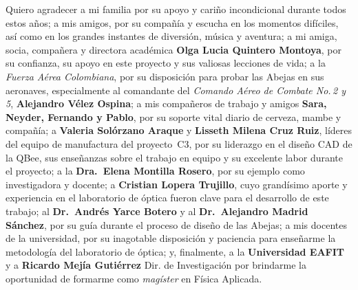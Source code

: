 \documentclass[
12pt, %
english, %
singlespacing, %
headsepline, %
]{MastersDoctoralThesis} %
\begin{document}
\begin{abstract}[\vspace*{0pt}]
\noindent Finally, Chapter~\ref{chap:conclusiones} synthesizes the findings, positioning the HuMath\textregistered{} QBee as a flight-ready payload and outlining a three-phase roadmap: (i) absolute calibration, (ii) operational validation with precise georeferencing, and (iii) automation of the processing workflow. Together, the chapters deliver an end-to-end guide from requirement definition to preliminary validation of a UAV multispectral system tailored to Colombia’s environmental monitoring needs.\\
\end{abstract}


\begin{acknowledgements}
\addchaptertocentry{\acknowledgementname} %
\noindent
Quiero agradecer a mi familia por su apoyo y cariño incondicional durante todos estos años; a mis amigos, por su compañía y escucha en los momentos difíciles, así como en los grandes instantes de diversión, música y aventura; a mi amiga, socia, compañera y directora académica \textbf{Olga Lucia Quintero Montoya}, por su confianza, su apoyo en este proyecto y sus valiosas lecciones de vida; a la \textit{Fuerza Aérea Colombiana}, por su disposición para probar las Abejas en sus aeronaves, especialmente al comandante del \textit{Comando Aéreo de Combate No.\,2 y 5}, \textbf{Alejandro Vélez Ospina}; a mis compañeros de trabajo y amigos \textbf{Sara, Neyder, Fernando y Pablo}, por su soporte vital diario de cerveza, mambe y compañía; a \textbf{Valeria Solórzano Araque} y \textbf{Lisseth Milena Cruz Ruiz}, líderes del equipo de manufactura del proyecto~C3, por su liderazgo en el diseño CAD de la QBee, sus enseñanzas sobre el trabajo en equipo y su excelente labor durante el proyecto; a la \textbf{Dra.\ Elena Montilla Rosero}, por su ejemplo como investigadora y docente; a \textbf{Cristian Lopera Trujillo}, cuyo grandísimo aporte y experiencia en el laboratorio de óptica fueron clave para el desarrollo de este trabajo; al \textbf{Dr.\ Andrés Yarce Botero} y al \textbf{Dr.\ Alejandro Madrid Sánchez}, por su guía durante el proceso de diseño de las Abejas; a mis docentes de la universidad, por su inagotable disposición y paciencia para enseñarme la metodología del laboratorio de óptica; y, finalmente, a la \textbf{Universidad EAFIT} y a \textbf{Ricardo Mejía Gutiérrez} Dir. de Investigación por brindarme la oportunidad de formarme como \textit{magíster} en Física Aplicada.
\end{acknowledgements}
\end{document}
